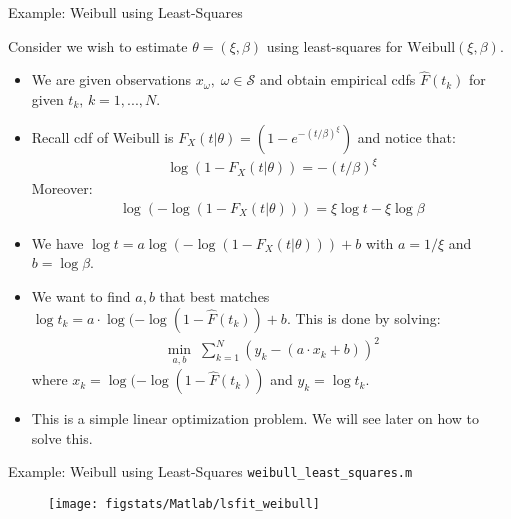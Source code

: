 \documentclass[handout,9pt]{beamer}
\begin{document}
%
\begin{frame}{Example: Weibull using Least-Squares}

Consider we wish to estimate $\theta=(\xi,\beta)$ using least-squares for $\textrm{Weibull}(\xi,\beta)$. 
\begin{itemize}
\item We are given observations $x_\omega,\; \omega \in \mathcal{S}$ and obtain empirical cdfs $\hat{F}(t_k)$ for given $t_k,\, k=1,...,N$. 
\item Recall cdf of Weibull is $F_X(t|\theta)=(1-e^{-(t/\beta)^\xi})$ and notice that:
\begin{align*}
\log(1-F_X(t|\theta))=-(t/\beta)^\xi
\end{align*}
Moreover:
\begin{align*}
\log(-\log(1-F_X(t|\theta)))= \xi \log t-\xi \log \beta
\end{align*}
\item We have $\log t=a\log(-\log(1-F_X(t|\theta)))+b$ with $a=1/\xi$ and $b=\log\beta$. 
\item We want to find $a,b$ that best matches $\log t_k=a\cdot \log(-\log(1-\hat{F}(t_k))+b$. This is done by solving:
\begin{align*}
\min_{a,b}\; \sum_{k=1}^N\left (y_k-(a\cdot x_k+b)\right)^2
\end{align*}
where $x_k=\log(-\log(1-\hat{F}(t_k))$ and $y_k=\log t_k$. 
\item This is a simple linear optimization problem. We will see later on how to solve this. 
\end{itemize}


\end{frame}

%
\begin{frame}{Example: Weibull using Least-Squares \footnotesize{\texttt{weibull\_least\_squares.m}}}

\begin{figure}[!htb]
    \centering
	\texttt{[image: figstats/Matlab/lsfit\_weibull]}
\end{figure}

\end{frame}
\end{document}
